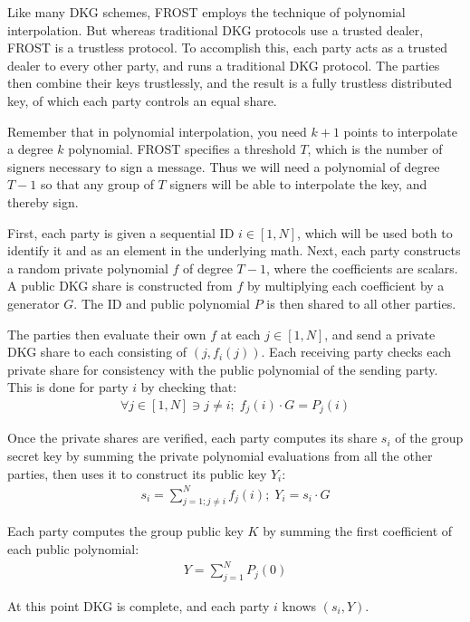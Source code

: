 \documentclass{article}
\begin{document}
Like many DKG schemes, FROST employs the technique of polynomial interpolation.  But whereas traditional DKG protocols use a trusted dealer, FROST is a trustless protocol.  To accomplish this, each party acts as a trusted dealer to every other party, and runs a traditional DKG protocol.  The parties then combine their keys trustlessly, and the result is a fully trustless distributed key, of which each party controls an equal share.

Remember that in polynomial interpolation, you need $k+1$ points to interpolate a degree $k$ polynomial.  FROST specifies a threshold $T$, which is the number of signers necessary to sign a message.  Thus we will need a polynomial of degree $T-1$ so that any group of $T$ signers will be able to interpolate the key, and thereby sign.

First, each party is given a sequential ID $i \in [1, N]$, which will be used both to identify it and as an element in the underlying math.  Next, each party constructs a random private polynomial $f$ of degree $T-1$, where the coefficients are scalars.  A public DKG share is constructed from $f$ by multiplying each coefficient by a generator $G$.  The ID and public polynomial $P$ is then shared to all other parties.

The parties then evaluate their own $f$ at each $j \in [1,N]$, and send a private DKG share to each consisting of $(j, f_i(j))$.  Each receiving party checks each private share for consistency with the public polynomial of the sending party.  This is done for party $i$ by checking that:
\begin{align}
  \forall j \in [1,N] \ni j \neq i;\;f_j(i) \cdot G = P_j(i)
\end{align}

Once the private shares are verified, each party computes its share $s_i$ of the group secret key by summing the private polynomial evaluations from all the other parties, then uses it to construct its public key $Y_i$:
\begin{align}
  s_i = \sum_{j=1; j \neq i}^{N} f_j(i) ;\; Y_i = s_i \cdot G
\end{align}

Each party computes the group public key $K$ by summing the first coefficient of each public polynomial:
\begin{align}
  Y = \sum_{j=1}^{N} P_j(0)
\end{align}

At this point DKG is complete, and each party $i$ knows $(s_i, Y)$.
\end{document}
